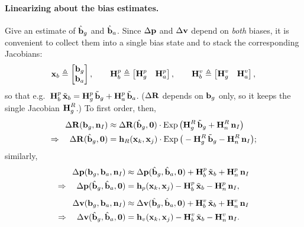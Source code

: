 \paragraph{Linearizing about the bias estimates.} Give an estimate of $\hat{\vect{b}}_g$ and $\hat{\vect{b}}_a$. Since $\Delta\vect{p}$ and $\Delta\vect{v}$ depend on \emph{both} biases, it is convenient to collect them into a single bias state and to stack the corresponding Jacobians:
\begin{align}
\vect{x}_b \triangleq \begin{bmatrix} \vect{b}_g \\ \vect{b}_a \end{bmatrix},
\qquad
\vect{H}_b^p \triangleq \begin{bmatrix} \vect{H}_g^p & \vect{H}_a^p \end{bmatrix},
\qquad
\vect{H}_b^v \triangleq \begin{bmatrix} \vect{H}_g^v & \vect{H}_a^v \end{bmatrix},
\label{eq:lec07-xb}
\end{align}
so that e.g.\ $\vect{H}_b^p\,\tilde{\vect{x}}_b = \vect{H}_g^p\,\tilde{\vect{b}}_g + \vect{H}_a^p\,\tilde{\vect{b}}_a$. ($\Delta\vect{R}$ depends on $\vect{b}_g$ only, so it keeps the single Jacobian $\vect{H}_g^R$.) To first order, then,
\begin{align}
\Delta\vect{R}(\vect{b}_g, \vect{n}_I)
&\approx \Delta\vect{R}(\hat{\vect{b}}_g, \vect{0})\cdot\Exp\big(\vect{H}_g^R\,\tilde{\vect{b}}_g + \vect{H}_n^R\,\vect{n}_I\big) \notag \\
\Rightarrow\quad
\Delta\vect{R}(\hat{\vect{b}}_g, \vect{0})
&= \vect{h}_R(\vect{x}_k, \vect{x}_j)\cdot\Exp\big(-\vect{H}_g^R\,\tilde{\vect{b}}_g - \vect{H}_n^R\,\vect{n}_I\big);
\end{align}
similarly,
\begin{align}
\Delta\vect{p}(\vect{b}_g, \vect{b}_a, \vect{n}_I)
&\approx \Delta\vect{p}(\hat{\vect{b}}_g, \hat{\vect{b}}_a, \vect{0})
+ \vect{H}_b^p\,\tilde{\vect{x}}_b + \vect{H}_n^p\,\vect{n}_I \notag \\
\Rightarrow\quad
\Delta\vect{p}(\hat{\vect{b}}_g, \hat{\vect{b}}_a, \vect{0})
&= \vect{h}_p(\vect{x}_k, \vect{x}_j)
- \vect{H}_b^p\,\tilde{\vect{x}}_b - \vect{H}_n^p\,\vect{n}_I, \\[4pt]
\Delta\vect{v}(\vect{b}_g, \vect{b}_a, \vect{n}_I)
&\approx \Delta\vect{v}(\hat{\vect{b}}_g, \hat{\vect{b}}_a, \vect{0})
+ \vect{H}_b^v\,\tilde{\vect{x}}_b + \vect{H}_n^v\,\vect{n}_I \notag \\
\Rightarrow\quad
\Delta\vect{v}(\hat{\vect{b}}_g, \hat{\vect{b}}_a, \vect{0})
&= \vect{h}_v(\vect{x}_k, \vect{x}_j)
- \vect{H}_b^v\,\tilde{\vect{x}}_b - \vect{H}_n^v\,\vect{n}_I.
\end{align}
